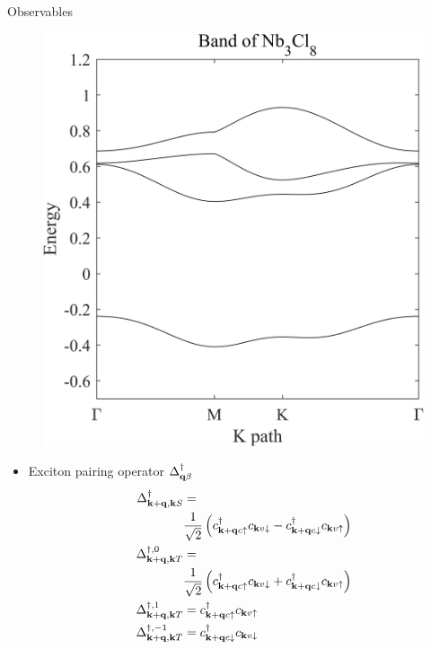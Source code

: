 \documentclass{beamer}
\begin{document}
\begin{frame}{Observables}
	\begin{multicols}{2}
		\begin{figure}[H]
			\includegraphics[width=1\linewidth]{figures/band.png}
		\end{figure}
		\newpage
		\begin{itemize}
			\item Exciton pairing operator $\Delta^\dagger_{\vb{q}\beta} $
			\begin{align*}
				\Delta^\dagger_{\vb{k+q,k}S} &=
				\\ &\frac{1}{\sqrt{2}}\left(c^\dagger_{\vb{k+q}c\uparrow}c_{\vb{k}v\downarrow}-c^\dagger_{\vb{k+q}c\downarrow}c_{\vb{k}v\uparrow}\right)\\
				\Delta^{\dagger,0}_{\vb{k+q,k}T} &= 
				\\ &\frac{1}{\sqrt{2}}\left(c^\dagger_{\vb{k+q}c\uparrow}c_{\vb{k}v\downarrow}+c^\dagger_{\vb{k+q}c\downarrow}c_{\vb{k}v\uparrow}\right)\\
				\Delta^{\dagger,1}_{\vb{k+q,k}T} &= c^\dagger_{\vb{k+q}c\uparrow}c_{\vb{k}v\uparrow}\\
				\Delta^{\dagger,-1}_{\vb{k+q,k}T} &= c^\dagger_{\vb{k+q}c\downarrow}c_{\vb{k}v\downarrow}
			\end{align*}
		\end{itemize}
	\end{multicols}
\end{frame}
\end{document}
